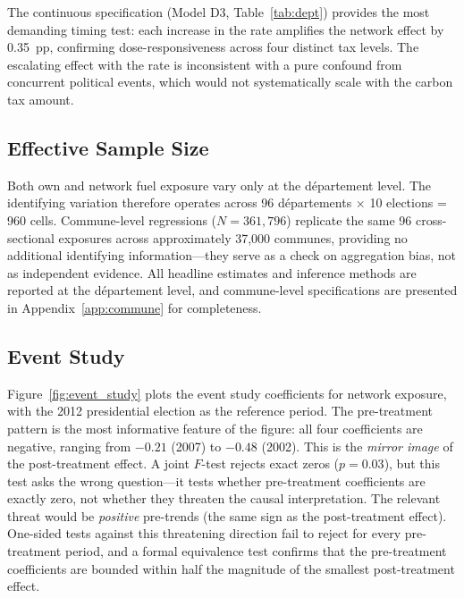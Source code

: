 \documentclass[12pt]{article}
\providecommand{\euro}{\texteuro}
\newcommand{\dept}{d\'{e}partement}
\newcommand{\depts}{d\'{e}partements}
\begin{document}
The continuous specification (Model D3, Table~\ref{tab:dept}) provides the most demanding timing test: each \euro 10 increase in the rate amplifies the network effect by 0.35~pp, confirming dose-responsiveness across four distinct tax levels. The escalating effect with the rate is inconsistent with a pure confound from concurrent political events, which would not systematically scale with the carbon tax amount.

\subsection{Effective Sample Size}
\label{sec:effective_n}

Both own and network fuel exposure vary only at the \dept{} level. The identifying variation therefore operates across 96 \depts{} $\times$ 10 elections = 960 cells. Commune-level regressions ($N = 361{,}796$) replicate the same 96 cross-sectional exposures across approximately 37,000 communes, providing no additional identifying information---they serve as a check on aggregation bias, not as independent evidence. All headline estimates and inference methods are reported at the \dept{} level, and commune-level specifications are presented in Appendix~\ref{app:commune} for completeness.

\subsection{Event Study}
\label{sec:event_study}

Figure~\ref{fig:event_study} plots the event study coefficients for network exposure, with the 2012 presidential election as the reference period. The pre-treatment pattern is the most informative feature of the figure: all four coefficients are negative, ranging from $-0.21$ (2007) to $-0.48$ (2002). This is the \emph{mirror image} of the post-treatment effect. A joint $F$-test rejects exact zeros ($p = 0.03$), but this test asks the wrong question---it tests whether pre-treatment coefficients are exactly zero, not whether they threaten the causal interpretation. The relevant threat would be \emph{positive} pre-trends (the same sign as the post-treatment effect). One-sided tests against this threatening direction fail to reject for every pre-treatment period, and a formal equivalence test confirms that the pre-treatment coefficients are bounded within half the magnitude of the smallest post-treatment effect.
\end{document}
